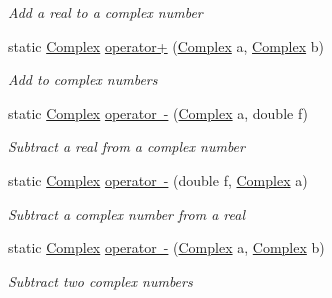 \begin{DoxyCompactItemize}
\begin{DoxyCompactList}\small\item\em Add a real to a complex number \end{DoxyCompactList}\item 
static \mbox{\hyperlink{struct_c_s_i_1_1_library_1_1_data_types_1_1_complex}{Complex}} \mbox{\hyperlink{struct_c_s_i_1_1_library_1_1_data_types_1_1_complex_a88fc3ce20a8f379d8301286b4d864bb6}{operator+}} (\mbox{\hyperlink{struct_c_s_i_1_1_library_1_1_data_types_1_1_complex}{Complex}} a, \mbox{\hyperlink{struct_c_s_i_1_1_library_1_1_data_types_1_1_complex}{Complex}} b)
\begin{DoxyCompactList}\small\item\em Add to complex numbers \end{DoxyCompactList}\item 
static \mbox{\hyperlink{struct_c_s_i_1_1_library_1_1_data_types_1_1_complex}{Complex}} \mbox{\hyperlink{struct_c_s_i_1_1_library_1_1_data_types_1_1_complex_a3ac8d7261717050f5169609f0eb920a2}{operator -\/}} (\mbox{\hyperlink{struct_c_s_i_1_1_library_1_1_data_types_1_1_complex}{Complex}} a, double f)
\begin{DoxyCompactList}\small\item\em Subtract a real from a complex number \end{DoxyCompactList}\item 
static \mbox{\hyperlink{struct_c_s_i_1_1_library_1_1_data_types_1_1_complex}{Complex}} \mbox{\hyperlink{struct_c_s_i_1_1_library_1_1_data_types_1_1_complex_a57f4d8b72c1b10a3cb364352172dfb08}{operator -\/}} (double f, \mbox{\hyperlink{struct_c_s_i_1_1_library_1_1_data_types_1_1_complex}{Complex}} a)
\begin{DoxyCompactList}\small\item\em Subtract a complex number from a real \end{DoxyCompactList}\item 
static \mbox{\hyperlink{struct_c_s_i_1_1_library_1_1_data_types_1_1_complex}{Complex}} \mbox{\hyperlink{struct_c_s_i_1_1_library_1_1_data_types_1_1_complex_a64756895a777cb7d1480ad4522d4651a}{operator -\/}} (\mbox{\hyperlink{struct_c_s_i_1_1_library_1_1_data_types_1_1_complex}{Complex}} a, \mbox{\hyperlink{struct_c_s_i_1_1_library_1_1_data_types_1_1_complex}{Complex}} b)
\begin{DoxyCompactList}\small\item\em Subtract two complex numbers \end{DoxyCompactList}\item 

\end{DoxyCompactItemize}
